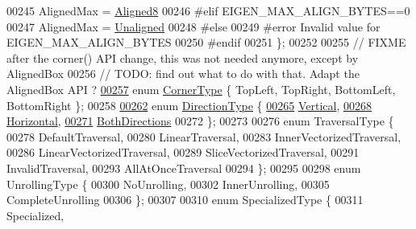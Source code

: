\begin{DoxyCode}
00245   AlignedMax = \hyperlink{group__enums_gga45fe06e29902b7a2773de05ba27b47a1ae9267ee4260c25c5b162ae72bf18a7bd}{Aligned8}
00246 \textcolor{preprocessor}{#elif EIGEN\_MAX\_ALIGN\_BYTES==0}
00247   AlignedMax = \hyperlink{group__enums_gga45fe06e29902b7a2773de05ba27b47a1ac935220b4c844108e183ebe30a4d5204}{Unaligned}
00248 \textcolor{preprocessor}{#else}
00249 \textcolor{preprocessor}{#error Invalid value for EIGEN\_MAX\_ALIGN\_BYTES}
00250 \textcolor{preprocessor}{#endif}
00251 \};
00252 
00255 \textcolor{comment}{// FIXME after the corner() API change, this was not needed anymore, except by AlignedBox}
00256 \textcolor{comment}{// TODO: find out what to do with that. Adapt the AlignedBox API ?}
\hyperlink{group__enums_gaafc7e22c8efbfefd5997e2cd9ec223e0}{00257} \textcolor{keyword}{enum} \hyperlink{group__enums_gaafc7e22c8efbfefd5997e2cd9ec223e0}{CornerType} \{ TopLeft, TopRight, BottomLeft, BottomRight \};
00258 
\hyperlink{group__enums_gad49a7b3738e273eb00932271b36127f7}{00262} \textcolor{keyword}{enum} \hyperlink{group__enums_gad49a7b3738e273eb00932271b36127f7}{DirectionType} \{ 
\hyperlink{group__enums_ggad49a7b3738e273eb00932271b36127f7addca718e0564723df21d61b94b1198be}{00265}   \hyperlink{group__enums_ggad49a7b3738e273eb00932271b36127f7addca718e0564723df21d61b94b1198be}{Vertical}, 
\hyperlink{group__enums_ggad49a7b3738e273eb00932271b36127f7aae8a16b3b9272683c1162915f6d892be}{00268}   \hyperlink{group__enums_ggad49a7b3738e273eb00932271b36127f7aae8a16b3b9272683c1162915f6d892be}{Horizontal}, 
\hyperlink{group__enums_ggad49a7b3738e273eb00932271b36127f7aa01e40fce022901560ce6d9fdee2fde3}{00271}   \hyperlink{group__enums_ggad49a7b3738e273eb00932271b36127f7aa01e40fce022901560ce6d9fdee2fde3}{BothDirections} 
00272 \};
00273 
00276 \textcolor{keyword}{enum} TraversalType \{
00278   DefaultTraversal,
00280   LinearTraversal,
00283   InnerVectorizedTraversal,
00286   LinearVectorizedTraversal,
00289   SliceVectorizedTraversal,
00291   InvalidTraversal,
00293   AllAtOnceTraversal
00294 \};
00295 
00298 \textcolor{keyword}{enum} UnrollingType \{
00300   NoUnrolling,
00302   InnerUnrolling,
00305   CompleteUnrolling
00306 \};
00307 
00310 \textcolor{keyword}{enum} SpecializedType \{
00311   Specialized,

\end{DoxyCode}
